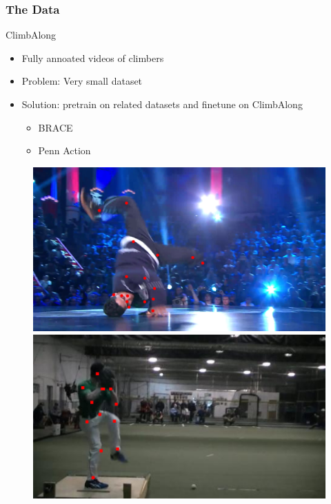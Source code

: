 \documentclass{beamer}
\begin{document}
\begin{frame}
    \frametitle{The Data}
    \begin{minipage}{0.5\textwidth}
        ClimbAlong
        \begin{itemize}
            \item Fully annoated videos of climbers
            \item Problem: Very small dataset
            \item Solution: pretrain on related datasets and finetune on ClimbAlong
            \begin{itemize}
                \item BRACE
                \item Penn Action
            \end{itemize}
        \end{itemize}
    \end{minipage} \hfill
    \begin{minipage}{0.45\textwidth}
        \begin{figure}
            \center
            \includegraphics[width = \textwidth]{../report/entities/BRACE_1152.png}
            \includegraphics[width = \textwidth]{../report/entities/PA_64.png}
        \end{figure}
    \end{minipage}
\end{frame}
\end{document}

